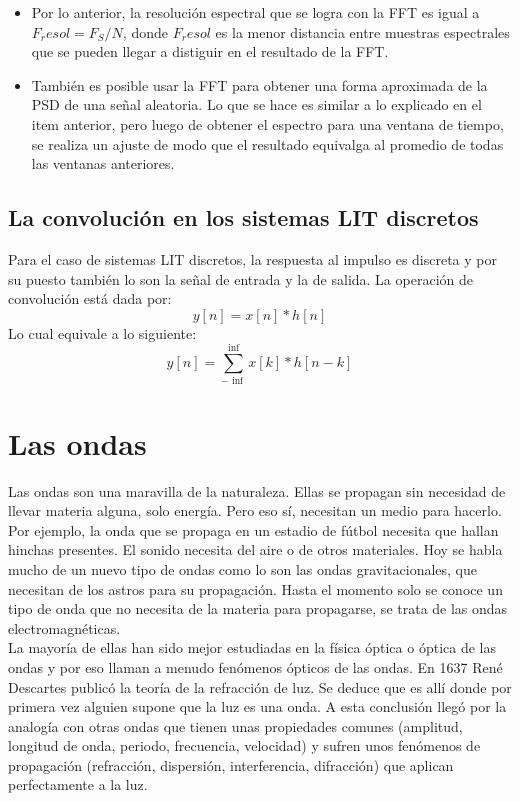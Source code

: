 \begin{itemize}
\begin{itemize}
         \item Por lo anterior, la resolución espectral que se logra con la FFT es igual a $F_resol=F_S/N$, donde $F_resol$ es la menor distancia entre muestras espectrales que se pueden llegar a distiguir en el resultado de la FFT.
         \item También es posible usar la FFT para obtener una forma aproximada de la PSD de una señal aleatoria. Lo que se hace es similar a lo explicado en el item anterior, pero luego de obtener el espectro para una ventana de tiempo, se realiza un ajuste de modo que el resultado equivalga al promedio de todas las ventanas anteriores.
     \end{itemize}
\end{itemize}


\subsection{La convolución en los sistemas LIT discretos}
Para el caso de sistemas LIT discretos, la respuesta al impulso es discreta y por su puesto también lo son la señal de entrada y la de salida. La operación de convolución está dada por:
\begin{equation} \label{hob3}
	 y[n]= x[n]*h[n]
\end{equation}
Lo cual equivale a lo siguiente:
\begin{equation} \label{hob4}
	 y[n]= \sum_{-\inf}^{\inf}  x[k]*h[n-k]
\end{equation}
\section{Las ondas}

Las ondas son una maravilla de la naturaleza. Ellas se propagan sin necesidad de llevar materia alguna, solo energía. Pero eso sí, necesitan un medio para hacerlo. Por ejemplo, la onda que se propaga en un estadio de fútbol necesita que hallan hinchas presentes. El sonido necesita del aire o de otros materiales. Hoy se habla mucho de un nuevo tipo de ondas como lo son las ondas gravitacionales, que necesitan de los astros para su propagación. Hasta el momento solo se conoce un tipo de onda que no necesita de la materia para propagarse, se trata de las ondas electromagnéticas. \\

La mayoría de ellas han sido mejor estudiadas en la física óptica o óptica de las ondas y por eso llaman a menudo fenómenos ópticos de las ondas. En 1637 René Descartes publicó la teoría de la refracción de luz. Se deduce que es allí donde por primera vez alguien supone que la luz es una onda. A esta conclusión llegó por la analogía con otras ondas que tienen unas propiedades comunes (amplitud, longitud de onda, periodo, frecuencia, velocidad) y sufren unos fenómenos de propagación (refracción, dispersión, interferencia, difracción) que aplican perfectamente a la luz. \\

